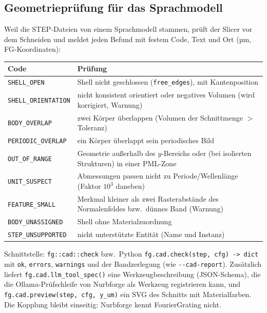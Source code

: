 \subsection{Geometrieprüfung für das Sprachmodell}\label{sec:cadcheck}
Weil die STEP-Dateien von einem Sprachmodell stammen, prüft der Slicer vor dem Schneiden und meldet jeden Befund mit
festem Code, Text und Ort (µm, FG-Koordinaten):
\begin{center}
\small
\begin{tabular}{p{3.6cm}p{10.6cm}}
\toprule
Code & Prüfung \\
\midrule
\verb|SHELL_OPEN| & Shell nicht geschlossen (\verb|free_edges|), mit Kantenposition \\
\verb|SHELL_ORIENTATION| & nicht konsistent orientiert oder negatives Volumen (wird korrigiert, Warnung) \\
\verb|BODY_OVERLAP| & zwei Körper überlappen (Volumen der Schnittmenge $>$ Toleranz) \\
\verb|PERIODIC_OVERLAP| & ein Körper überlappt sein periodisches Bild \\
\verb|OUT_OF_RANGE| & Geometrie außerhalb des $y$-Bereichs oder (bei isolierten Strukturen) in einer PML-Zone \\
\verb|UNIT_SUSPECT| & Abmessungen passen nicht zu Periode/Wellenlänge (Faktor $10^3$ daneben) \\
\verb|FEATURE_SMALL| & Merkmal kleiner als zwei Rasterabstände des Normalenfeldes bzw.\ dünnes Band (Warnung) \\
\verb|BODY_UNASSIGNED| & Shell ohne Materialzuordnung \\
\verb|STEP_UNSUPPORTED| & nicht unterstützte Entität (Name und Instanz) \\
\bottomrule
\end{tabular}
\end{center}
Schnittstelle: \verb|fg::cad::check| bzw.\ Python \verb|fg.cad.check(step, cfg) -> dict| mit \verb|ok|, \verb|errors|,
\verb|warnings| und der Bandzerlegung (wie \verb|--cad-report|). Zusätzlich liefert \verb|fg.cad.llm_tool_spec()| eine
Werkzeugbeschreibung (JSON-Schema), die die Ollama-Prüfschleife von Nurbforge als Werkzeug registrieren kann, und
\verb|fg.cad.preview(step, cfg, y_um)| ein SVG des Schnitts mit Materialfarben. Die Kopplung bleibt einseitig: Nurbforge
kennt FourierGrating nicht.

